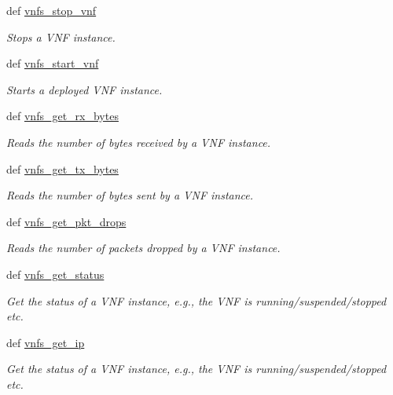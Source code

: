 \begin{DoxyCompactItemize}
def \hyperlink{classvnfs__operations_1_1VNFSOperations_a3c95617427fa157dbde8246a260546ed}{vnfs\-\_\-stop\-\_\-vnf}
\begin{DoxyCompactList}\small\item\em Stops a V\-N\-F instance. \end{DoxyCompactList}\item 
def \hyperlink{classvnfs__operations_1_1VNFSOperations_a1f88fc97d23ebfac8a99a71542ca5219}{vnfs\-\_\-start\-\_\-vnf}
\begin{DoxyCompactList}\small\item\em Starts a deployed V\-N\-F instance. \end{DoxyCompactList}\item 
def \hyperlink{classvnfs__operations_1_1VNFSOperations_a27409856538f49f14a8506635ded95b7}{vnfs\-\_\-get\-\_\-rx\-\_\-bytes}
\begin{DoxyCompactList}\small\item\em Reads the number of bytes received by a V\-N\-F instance. \end{DoxyCompactList}\item 
def \hyperlink{classvnfs__operations_1_1VNFSOperations_ab4617f4573ef7d6c4106b0fdbf728022}{vnfs\-\_\-get\-\_\-tx\-\_\-bytes}
\begin{DoxyCompactList}\small\item\em Reads the number of bytes sent by a V\-N\-F instance. \end{DoxyCompactList}\item 
def \hyperlink{classvnfs__operations_1_1VNFSOperations_a05a7ab8ae7e8a2ab7502a1d4e0113144}{vnfs\-\_\-get\-\_\-pkt\-\_\-drops}
\begin{DoxyCompactList}\small\item\em Reads the number of packets dropped by a V\-N\-F instance. \end{DoxyCompactList}\item 
def \hyperlink{classvnfs__operations_1_1VNFSOperations_ac2787ee33d5944c39a07321e270bdcfd}{vnfs\-\_\-get\-\_\-status}
\begin{DoxyCompactList}\small\item\em Get the status of a V\-N\-F instance, e.\-g., the V\-N\-F is running/suspended/stopped etc. \end{DoxyCompactList}\item 
def \hyperlink{classvnfs__operations_1_1VNFSOperations_a482dc96295584a1ca84300f04d000f26}{vnfs\-\_\-get\-\_\-ip}
\begin{DoxyCompactList}\small\item\em Get the status of a V\-N\-F instance, e.\-g., the V\-N\-F is running/suspended/stopped etc. \end{DoxyCompactList}\end{DoxyCompactItemize}

